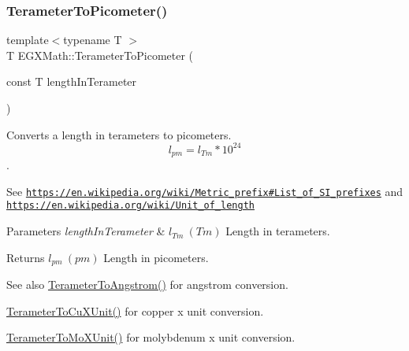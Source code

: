 \subsubsection{\texorpdfstring{Terameter\+To\+Picometer()}{TerameterToPicometer()}}
{\footnotesize\ttfamily template$<$typename T $>$ \\
T E\+G\+X\+Math\+::\+Terameter\+To\+Picometer (\begin{DoxyParamCaption}\item[{const T}]{length\+In\+Terameter }\end{DoxyParamCaption})}



Converts a length in terameters to picometers. \[ l_{pm}=l_{Tm} * 10^{24} \]. 

See \href{https://en.wikipedia.org/wiki/Metric_prefix#List_of_SI_prefixes}{\tt https\+://en.\+wikipedia.\+org/wiki/\+Metric\+\_\+prefix\#\+List\+\_\+of\+\_\+\+S\+I\+\_\+prefixes} and \href{https://en.wikipedia.org/wiki/Unit_of_length}{\tt https\+://en.\+wikipedia.\+org/wiki/\+Unit\+\_\+of\+\_\+length} 
\begin{DoxyParams}{Parameters}
{\em length\+In\+Terameter} & $ l_{Tm}\ (Tm)$ Length in terameters. \\
\hline
\end{DoxyParams}
\begin{DoxyReturn}{Returns}
$ l_{pm}\ (pm)$ Length in picometers. 
\end{DoxyReturn}
\begin{DoxySeeAlso}{See also}
\mbox{\hyperlink{group___e_g_x_math-_conversions-_length_conversions-_terameter-_non-_s_i_gaab75399e224bea4ea7ddb8bf5f557ee0}{Terameter\+To\+Angstrom()}} for angstrom conversion. 

\mbox{\hyperlink{group___e_g_x_math-_conversions-_length_conversions-_terameter-_non-_s_i_ga5eab9d29867c570350691cca342c9472}{Terameter\+To\+Cu\+X\+Unit()}} for copper x unit conversion. 

\mbox{\hyperlink{group___e_g_x_math-_conversions-_length_conversions-_terameter-_non-_s_i_ga391bcf9b529c2e20f2773c699bb0197a}{Terameter\+To\+Mo\+X\+Unit()}} for molybdenum x unit conversion. 
\end{DoxySeeAlso}
\mbox{\label{group___e_g_x_math-_conversions-_length_conversions-_terameter-_s_i_ga8cdb09d983691434d45c52808465c92f}} 
